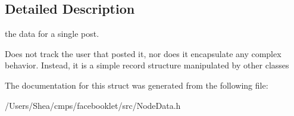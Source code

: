 \subsection{Detailed Description}
the data for a single post. 

Does not track the user that posted it, nor does it encapsulate any complex behavior. Instead, it is a simple record structure manipulated by other classes 

The documentation for this struct was generated from the following file\+:\begin{DoxyCompactItemize}
\item 
/\+Users/\+Shea/cmps/facebooklet/src/Node\+Data.\+h\end{DoxyCompactItemize}
